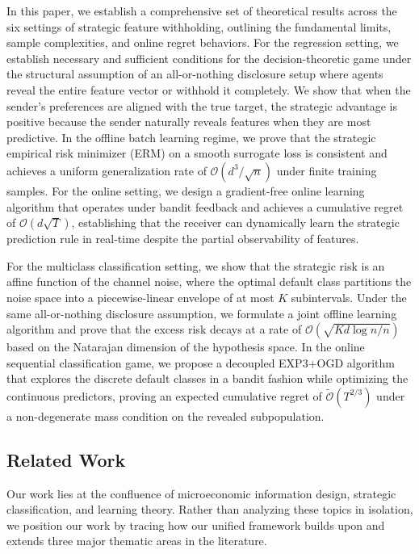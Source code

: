 In this paper, we establish a comprehensive set of theoretical results across the six settings of strategic feature withholding, outlining the fundamental limits, sample complexities, and online regret behaviors. For the regression setting, we establish necessary and sufficient conditions for the decision-theoretic game under the structural assumption of an all-or-nothing disclosure setup where agents reveal the entire feature vector or withhold it completely. We show that when the sender's preferences are aligned with the true target, the strategic advantage is positive because the sender naturally reveals features when they are most predictive. In the offline batch learning regime, we prove that the strategic empirical risk minimizer (ERM) on a smooth surrogate loss is consistent and achieves a uniform generalization rate of $\mathcal{O}(d^3 / \sqrt{n})$ under finite training samples. For the online setting, we design a gradient-free online learning algorithm that operates under bandit feedback and achieves a cumulative regret of $\mathcal{O}(d \sqrt{T})$, establishing that the receiver can dynamically learn the strategic prediction rule in real-time despite the partial observability of features.

For the multiclass classification setting, we show that the strategic risk is an affine function of the channel noise, where the optimal default class partitions the noise space into a piecewise-linear envelope of at most $K$ subintervals. Under the same all-or-nothing disclosure assumption, we formulate a joint offline learning algorithm and prove that the excess risk decays at a rate of $\mathcal{O}(\sqrt{Kd \log n / n})$ based on the Natarajan dimension of the hypothesis space. In the online sequential classification game, we propose a decoupled EXP3+OGD algorithm that explores the discrete default classes in a bandit fashion while optimizing the continuous predictors, proving an expected cumulative regret of $\tilde{\mathcal{O}}(T^{2/3})$ under a non-degenerate mass condition on the revealed subpopulation.

\subsection{Related Work}
Our work lies at the confluence of microeconomic information design, strategic classification, and learning theory. Rather than analyzing these topics in isolation, we position our work by tracing how our unified framework builds upon and extends three major thematic areas in the literature.

